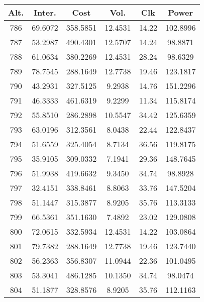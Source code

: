 \begin{center}
\begin{footnotesize}
\begin{tabular}{|c|ccccc|}
\hline
Alt. & Inter. & Cost & Vol. & Clk & Power\\
\hline
786 & 69.6072 & 358.5851 & 12.4531 & 14.22 & 102.8996 \\
787 & 53.2987 & 490.4301 & 12.5707 & 14.24 & 98.8871 \\
788 & 61.0634 & 380.2269 & 12.4531 & 28.24 & 98.6329 \\
789 & 78.7545 & 288.1649 & 12.7738 & 19.46 & 123.1817 \\
790 & 43.2931 & 327.5125 & 9.2938 & 14.76 & 151.2296 \\
791 & 46.3333 & 461.6319 & 9.2299 & 11.34 & 115.8174 \\
792 & 55.8510 & 286.2898 & 10.5547 & 34.42 & 125.6359 \\
793 & 63.0196 & 312.3561 & 8.0438 & 22.44 & 122.8437 \\
794 & 51.6559 & 325.4054 & 8.7134 & 36.56 & 119.8175 \\
795 & 35.9105 & 309.0332 & 7.1941 & 29.36 & 148.7645 \\
796 & 51.9938 & 419.6632 & 9.3450 & 34.74 & 98.8928 \\
797 & 32.4151 & 338.8461 & 8.8063 & 33.76 & 147.5204 \\
798 & 51.1447 & 315.3877 & 8.9205 & 35.76 & 113.3133 \\
799 & 66.5361 & 351.1630 & 7.4892 & 23.02 & 129.0808 \\
800 & 72.0615 & 332.5934 & 12.4531 & 14.22 & 103.0864 \\
801 & 79.7382 & 288.1649 & 12.7738 & 19.46 & 123.7440 \\
802 & 56.2363 & 356.8307 & 11.0944 & 22.36 & 101.0495 \\
803 & 53.3041 & 486.1285 & 10.1350 & 34.74 & 98.0474 \\
804 & 51.1877 & 328.8576 & 8.9205 & 35.76 & 112.1163 \\
\hline
\end{tabular}
\end{footnotesize}
\end{center}


